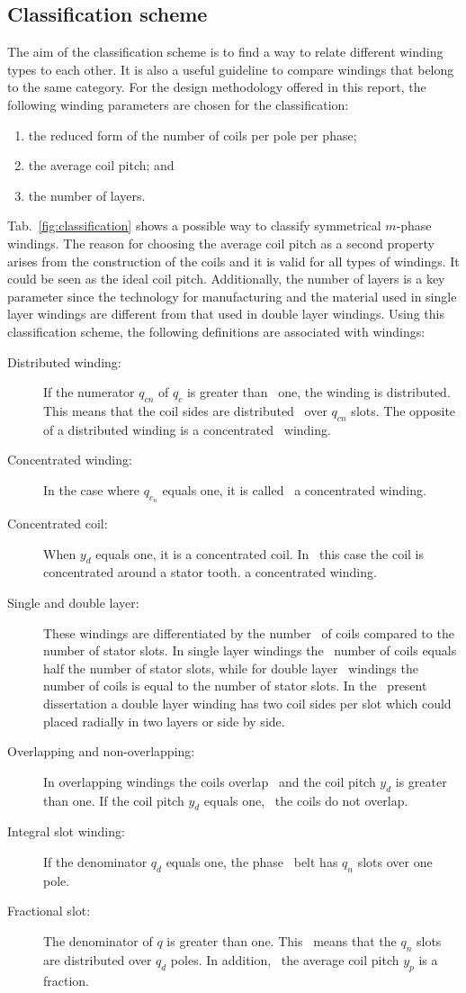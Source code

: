 \subsection{Classification scheme}
The aim of the classification scheme is to find a way to relate different winding types to each other. It is also a useful guideline to compare windings that belong to the same category. For the design methodology offered in this report, the following winding parameters are chosen for the classification:
\begin{enumerate}
	\item the reduced form of the number of coils per pole per phase;
	\item the average coil pitch; and 
	\item the number of layers.
\end{enumerate}
Tab.~\ref{fig:classification} shows a possible way to classify symmetrical $m$-phase windings. The reason for choosing the average coil pitch as a second property arises from the construction of the coils and it is valid for all types of windings. It could be seen as the ideal coil pitch. Additionally, the number of layers is a key parameter since the technology for manufacturing and the material used in single layer windings are different from that used in double layer windings. Using this classification scheme, the following definitions are associated with windings:
\begin{description}
	\item[Distributed winding:] If the numerator $q_{cn}$ of $q_c$ is greater than~%
	one, the winding is distributed. This means that the coil sides are distributed~%
	over $q_{cn}$ slots. The opposite of a distributed winding is a concentrated~%
	winding.
	\item[Concentrated winding:] In the case where $q_{c_n}$ equals one, it is called~%
	a concentrated winding. 
	\item[Concentrated coil:] When $y_d$ equals one, it is a concentrated coil. In~%
	this case the coil is concentrated around a stator tooth.
	a concentrated winding. 
	\item[Single and double layer:] These windings are differentiated by the number~%
	of coils compared to the number of stator slots. In single layer windings the~%
	number of coils equals half the number of stator slots, while for double layer~%
	windings the number of coils is equal to the number of stator slots. In the~%
	present dissertation a double layer winding has two coil sides per slot which could~%
	placed radially in two layers or side by side. 
	\item[Overlapping and non-overlapping:] In overlapping windings the coils overlap~%
	and the coil pitch $y_d$ is greater than one. If the coil pitch $y_d$ equals one,~%
	the coils do not overlap.
	\item[Integral slot winding:] If the denominator $q_d$ equals one, the phase~%
	belt has $q_n$ slots over one pole.
	\item[Fractional slot:] The denominator of $q$ is greater than one. This~%
	means that the $q_n$ slots are distributed over $q_d$ poles. In addition,~%
	the average coil pitch $y_p$ is a fraction. 
\end{description}
